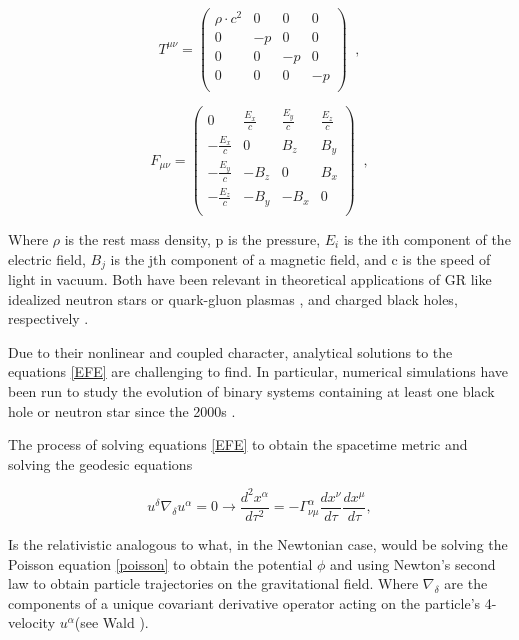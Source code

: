 \begin{equation}\label{PF}
T^{\mu \nu} = 
\begin{pmatrix}
\rho \cdot c^2&0&0&0 \\
0&-p&0&0 \\
0&0&-p&0 \\
0&0&0&-p\\
\end{pmatrix} \;\; ,
\end{equation}

\begin{equation}
F_{\mu \nu} = 
\begin{pmatrix}
0&\frac{E_x}{c}&\frac{E_y}{c}&\frac{E_z}{c} \\
-\frac{E_x}{c} &0   &B_z  &B_y \\
-\frac{E_y}{c} &-B_z&0    &B_x \\
-\frac{E_z}{c} &-B_y&-B_x &0\\
\end{pmatrix} \;\;,
\end{equation}


Where $\rho$ is the rest mass density, p is the pressure, $E_i$ is the ith component of the electric field, $B_j$ is the jth component of a magnetic field, and c is the speed of light in vacuum. Both have been relevant in theoretical applications of GR like idealized neutron stars or quark-gluon plasmas \cite{Nagle_2011}, and charged black holes, respectively \cite{PhysRevD.13.2713}.

Due to their nonlinear and coupled character, analytical solutions to the equations \ref{EFE} are challenging to find. In particular, numerical simulations have been run to study the evolution of binary systems containing at least one black hole or neutron star since the 2000s \cite{Shibata:1999hn,Shibata:1999wm,Shibata:2019wef}.

The process of solving equations \ref{EFE} to obtain the spacetime metric and solving the geodesic equations 

\begin{equation}\label{par-trans}
u^{\delta} \nabla_{\delta } u^{\alpha } = 
0 \rightarrow \frac{d^2 x^{\alpha}}{d\tau^2} = - \Gamma^{\alpha}_{\nu\mu} \frac{dx^{\nu}}{d\tau} \frac{dx^{\mu}}{d\tau},
\end{equation}

Is the relativistic analogous to what, in the Newtonian case, would be solving the Poisson equation \ref{poisson} to obtain the potential $\phi$ and using Newton's second law to obtain particle trajectories on the gravitational field. Where  $\nabla_{\delta}$ are the components of a unique covariant derivative operator acting on the particle's 4-velocity $u^{\alpha}$(see Wald \cite{Wald:1984rg}). 

